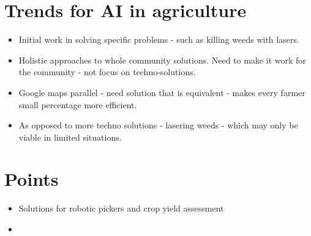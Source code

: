 \documentclass[11pt]{article}
\begin{document}
\section{Trends for AI in agriculture}
\label{sec:org4608252}
\begin{itemize}
\item Initial work in solving specific problems - such as killing weeds with lasers.
\item Holistic approaches to whole community solutions. Need to make it work for the community - not focus on techno-solutions.
\item Google maps parallel - need solution that is equivalent - makes every farmer small percentage more efficient.
\item As opposed to more techno solutions - lasering weeds - which may only be viable in limited situations.
\end{itemize}


\section{Points}
\label{sec:orgc9cba20}
\begin{itemize}
\item Solutions for robotic pickers and crop yield assessment
\item 
\end{itemize}
\end{document}
